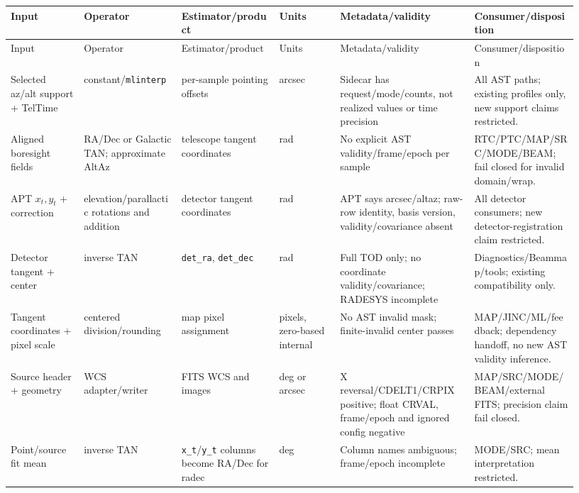 \documentclass[11pt]{article}
\newcommand{\code}[1]{\nolinkurl{#1}}
\newcommand{\breakslash}{/\allowbreak}
\begin{document}
\begin{longtable}{L{0.12\linewidth}L{0.16\linewidth}L{0.16\linewidth}L{0.10\linewidth}L{0.22\linewidth}L{0.17\linewidth}}
\toprule
Input & Operator & Estimator/product & Units & Metadata/validity & Consumer/disposition \\
\midrule
\endfirsthead
\toprule
Input & Operator & Estimator/product & Units & Metadata/validity & Consumer/disposition \\
\midrule
\endhead
Selected az/alt support + TelTime & constant/\code{mlinterp} & per-sample pointing offsets & arcsec & Sidecar has request/mode/counts, not realized values or time precision & All AST paths; existing profiles only, new support claims restricted. \\
Aligned boresight fields & RA\breakslash Dec or Galactic TAN; approximate AltAz & telescope tangent coordinates & rad & No explicit AST validity\breakslash frame\breakslash epoch per sample & RTC\breakslash PTC\breakslash MAP\breakslash SRC\breakslash MODE\breakslash BEAM; fail closed for invalid domain\breakslash wrap. \\
APT $x_t,y_t$ + correction & elevation\breakslash parallactic rotations and addition & detector tangent coordinates & rad & APT says arcsec\breakslash altaz; raw-row identity, basis version, validity\breakslash covariance absent & All detector consumers; new detector-registration claim restricted. \\
Detector tangent + center & inverse TAN & \code{det_ra}, \code{det_dec} & rad & Full TOD only; no coordinate validity\breakslash covariance; RADESYS incomplete & Diagnostics\breakslash Beammap\breakslash tools; existing compatibility only. \\
Tangent coordinates + pixel scale & centered division\breakslash rounding & map pixel assignment & pixels, zero-based internal & No AST invalid mask; finite-invalid center passes & MAP\breakslash JINC\breakslash ML\breakslash feedback; dependency handoff, no new AST validity inference. \\
Source header + geometry & WCS adapter\breakslash writer & FITS WCS and images & deg or arcsec & X reversal\breakslash CDELT1\breakslash CRPIX positive; float CRVAL, frame\breakslash epoch and ignored config negative & MAP\breakslash SRC\breakslash MODE\breakslash BEAM\breakslash external FITS; precision claim fail closed. \\
Point/source fit mean & inverse TAN & \code{x_t}/\code{y_t} columns become RA/Dec for radec & deg & Column names ambiguous; frame/epoch incomplete & MODE/SRC; mean interpretation restricted. \\

\end{longtable}
\end{document}
